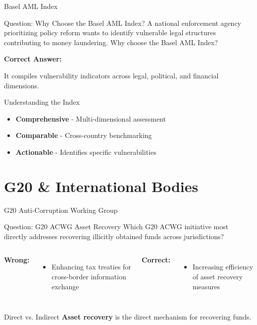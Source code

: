 \documentclass{beamer}
\begin{document}
\begin{frame}{Basel AML Index}
\begin{block}{Question: Why Choose the Basel AML Index?}
\small{A national enforcement agency prioritizing policy reform wants to identify vulnerable legal structures contributing to money laundering. Why choose the Basel AML Index?}
\end{block}

\vspace{0.3cm}
\textcolor{correct}{\textbf{Correct Answer:}}
\begin{center}
\Large{It compiles vulnerability indicators across legal, political, and financial dimensions.}
\end{center}

\begin{block}{Understanding the Index}
\begin{itemize}
    \item \textbf{Comprehensive} - Multi-dimensional assessment
    \item \textbf{Comparable} - Cross-country benchmarking
    \item \textbf{Actionable} - Identifies specific vulnerabilities
\end{itemize}
\end{block}
\end{frame}

\section{G20 \& International Bodies}
\begin{frame}{G20 Anti-Corruption Working Group}
\begin{block}{Question: G20 ACWG Asset Recovery}
\small{Which G20 ACWG initiative most directly addresses recovering illicitly obtained funds across jurisdictions?}
\end{block}

\begin{columns}
\textcolor{wrong}{\textbf{ Wrong:}}
\begin{itemize}
    \item Enhancing tax treaties for cross-border information exchange
\end{itemize}

\textcolor{correct}{\textbf{Correct:}}
\begin{itemize}
    \item Increasing efficiency of asset recovery measures
\end{itemize}
\end{columns}

\begin{block}{Direct vs. Indirect}
\textbf{Asset recovery} is the direct mechanism for recovering funds.
\end{block}
\end{frame}
\end{document}
